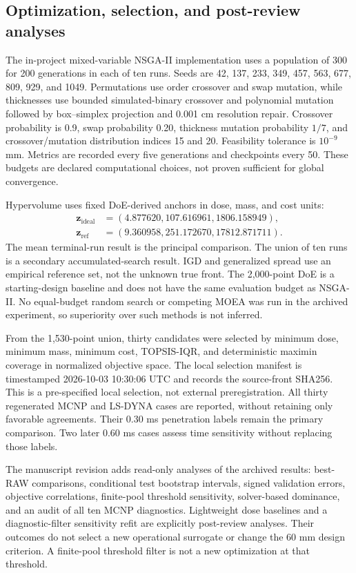 \documentclass[12pt]{elsarticle}
\begin{document}
\subsection{Optimization, selection, and post-review analyses}
The in-project mixed-variable NSGA-II implementation uses a population of 300 for 200 generations in each of ten runs. Seeds are 42, 137, 233, 349, 457, 563, 677, 809, 929, and 1049. Permutations use order crossover and swap mutation, while thicknesses use bounded simulated-binary crossover and polynomial mutation followed by box--simplex projection and 0.001 cm resolution repair. Crossover probability is 0.9, swap probability 0.20, thickness mutation probability $1/7$, and crossover/mutation distribution indices 15 and 20. Feasibility tolerance is $10^{-9}$ mm. Metrics are recorded every five generations and checkpoints every 50. These budgets are declared computational choices, not proven sufficient for global convergence.

Hypervolume uses fixed DoE-derived anchors in dose, mass, and cost units:
\begin{align*}
\boldsymbol z_{\mathrm{ideal}}&=(4.877620,107.616961,1806.158949),\\
\boldsymbol z_{\mathrm{ref}}&=(9.360958,251.172670,17812.871711).
\end{align*}
The mean terminal-run result is the principal comparison. The union of ten runs is a secondary accumulated-search result. IGD and generalized spread use an empirical reference set, not the unknown true front. The 2,000-point DoE is a starting-design baseline and does not have the same evaluation budget as NSGA-II. No equal-budget random search or competing MOEA was run in the archived experiment, so superiority over such methods is not inferred.

From the 1,530-point union, thirty candidates were selected by minimum dose, minimum mass, minimum cost, TOPSIS-IQR, and deterministic maximin coverage in normalized objective space. The local selection manifest is timestamped 2026-10-03 10:30:06 UTC and records the source-front SHA256. This is a pre-specified local selection, not external preregistration. All thirty regenerated MCNP and LS-DYNA cases are reported, without retaining only favorable agreements. Their 0.30 ms penetration labels remain the primary comparison. Two later 0.60 ms cases assess time sensitivity without replacing those labels.

The manuscript revision adds read-only analyses of the archived results: best-RAW comparisons, conditional test bootstrap intervals, signed validation errors, objective correlations, finite-pool threshold sensitivity, solver-based dominance, and an audit of all ten MCNP diagnostics. Lightweight dose baselines and a diagnostic-filter sensitivity refit are explicitly post-review analyses. Their outcomes do not select a new operational surrogate or change the 60 mm design criterion. A finite-pool threshold filter is not a new optimization at that threshold.
\end{document}
